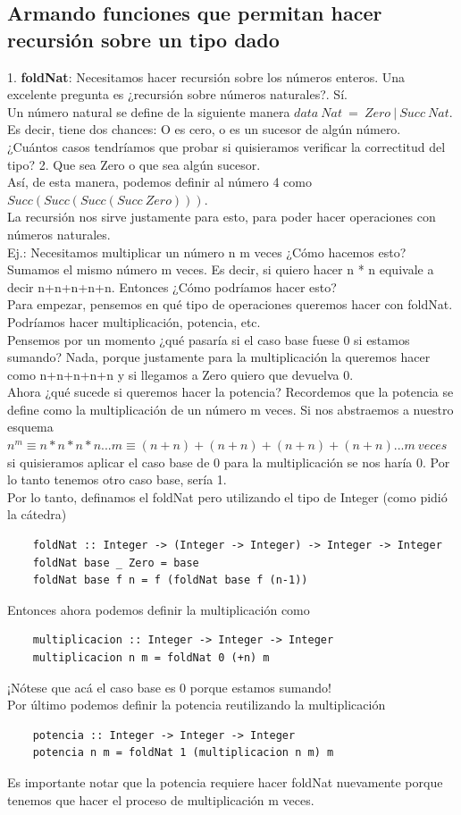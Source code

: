 \documentclass[10pt,a4paper]{article}
\begin{document}
\subsection*{Armando funciones que permitan hacer recursión sobre un tipo dado}
1. \textbf{foldNat}: Necesitamos hacer recursión sobre los números enteros. Una excelente pregunta es ¿recursión sobre números naturales?. Sí. \\
Un número natural se define de la siguiente manera $data \ Nat \ = \ Zero \ | \ Succ \ Nat$. Es decir, tiene dos chances: O es cero, o es un sucesor de algún número. \\
¿Cuántos casos tendríamos que probar si quisieramos verificar la correctitud del tipo? 2. Que sea Zero o que sea algún sucesor. \\
Así, de esta manera, podemos definir al número 4 como $Succ(Succ(Succ(Succ  \ Zero)))$. \\
La recursión nos sirve justamente para esto, para poder hacer operaciones con números naturales. \\
Ej.: Necesitamos multiplicar un número n m veces ¿Cómo hacemos esto? Sumamos el mismo número m veces. Es decir, si quiero hacer n * n equivale a decir n+n+n+n+n. Entonces ¿Cómo podríamos hacer esto? \\
Para empezar, pensemos en qué tipo de operaciones queremos hacer con foldNat. Podríamos hacer multiplicación, potencia, etc. \\
Pensemos por un momento ¿qué pasaría si el caso base fuese 0 si estamos sumando? Nada, porque justamente para la multiplicación la queremos hacer como n+n+n+n+n y si llegamos a Zero quiero que devuelva 0. \\
Ahora ¿qué sucede si queremos hacer la potencia? Recordemos que la potencia se define como la multiplicación de un número m veces. Si nos abstraemos a nuestro esquema $n^{m} \equiv n * n * n * n ... m\equiv (n+n) + (n+n) + (n+n) + (n+n) ... m \ veces$ si quisieramos aplicar el caso base de 0 para la multiplicación se nos haría 0. Por lo tanto tenemos otro caso base, sería 1. \\
Por lo tanto, definamos el foldNat pero utilizando el tipo de Integer (como pidió la cátedra)
\begin{lstlisting}
    foldNat :: Integer -> (Integer -> Integer) -> Integer -> Integer
    foldNat base _ Zero = base 
    foldNat base f n = f (foldNat base f (n-1))
\end{lstlisting}
Entonces ahora podemos definir la multiplicación como 
\begin{lstlisting}
    multiplicacion :: Integer -> Integer -> Integer 
    multiplicacion n m = foldNat 0 (+n) m 
\end{lstlisting}
¡Nótese que acá el caso base es 0 porque estamos sumando! \\
Por último podemos definir la potencia reutilizando la multiplicación 
\begin{lstlisting}
    potencia :: Integer -> Integer -> Integer 
    potencia n m = foldNat 1 (multiplicacion n m) m
\end{lstlisting}
Es importante notar que la potencia requiere hacer foldNat nuevamente porque tenemos que hacer el proceso de multiplicación m veces. 
\end{document}
